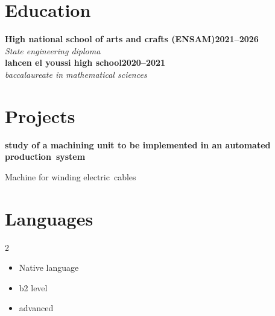 \documentclass[letterpaper,10pt]{article}
\newcommand{\heading}[2]{
  \hspace{10pt}#1\hfill#2\\
}
\newcommand{\headingBf}[2]{
  \heading{\textbf{#1}}{\textbf{#2}}
}
\newcommand{\headingIt}[2]{
  \heading{\textit{#1}}{\textit{#2}}
}
\newenvironment{resume_list}{
  \vspace{-7pt}
  \begin{itemize}[itemsep=-2px, parsep=1pt, leftmargin=30pt]
}{
  \end{itemize}
}
\begin{document}
    



  \section{Education}

  \headingBf{High national school of arts and crafts (ENSAM)}{2021--2026}
  \headingIt{State engineering diploma}{}
    \headingBf{lahcen el youssi high school}{2020--2021}
  \headingIt{baccalaureate in mathematical sciences}{}
  

  \vspace{5pt}
  

 


  \section{Projects}

  \headingBf{study of a machining unit to be implemented in an automated production system}{}
  \begin{resume_list}
    \item Machine for winding electric cables

  \end{resume_list}


 
  
   \section{Languages}

  \begin{multicols}{2}
    \begin{itemize}[itemsep=-2px, parsep=1pt, leftmargin=75pt]
      \item[\textbf{Arabic}] Native language
      \item[\textbf{French}] b2 level
      \item[\textbf{English}] advanced
      
    \end{itemize}
  \end{multicols}
\end{document}
